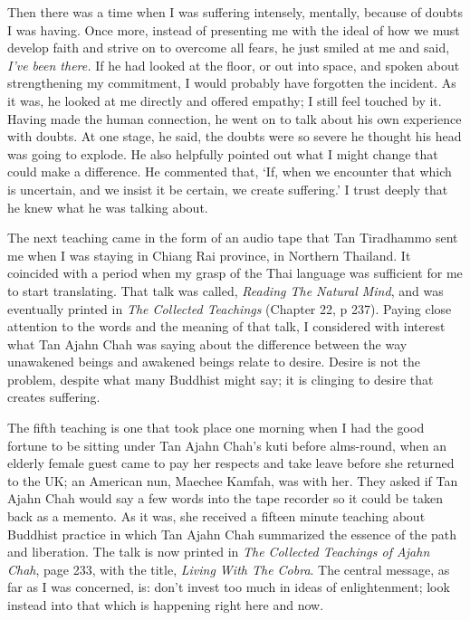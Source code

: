 Then there was a time when I was suffering intensely, mentally, because
of doubts I was having. Once more, instead of presenting me with the
ideal of how we must develop faith and strive on to overcome all fears,
he just smiled at me and said, \emph{I've been there.} If he had looked
at the floor, or out into space, and spoken about strengthening my
commitment, I would probably have forgotten the incident. As it was, he
looked at me directly and offered empathy; I still feel touched by it.
Having made the human connection, he went on to talk about his own
experience with doubts. At one stage, he said, the doubts were so severe
he thought his head was going to explode. He also helpfully pointed out
what I might change that could make a difference. He commented that,
`If, when we encounter that which is uncertain, and we insist it be
certain, we create suffering.' I trust deeply that he knew what he was
talking about.

The next teaching came in the form of an audio tape that Tan Tiradhammo
sent me when I was staying in Chiang Rai province, in Northern Thailand.
It coincided with a period when my grasp of the Thai language was
sufficient for me to start translating. That talk was called, \emph{Reading
The Natural Mind}, and was eventually printed in \emph{The Collected Teachings}\cite{collected}
(Chapter 22, p 237).
Paying close attention to the words and the meaning of that talk, I considered with
interest what Tan Ajahn Chah was saying about the difference between the
way unawakened beings and awakened beings relate to desire. Desire is
not the problem, despite what many Buddhist might say; it is clinging to
desire that creates suffering.

The fifth teaching is one that took place one morning when I had the
good fortune to be sitting under Tan Ajahn Chah's kuti before
alms-round, when an elderly female guest came to pay her respects and
take leave before she returned to the UK; an American nun, Maechee Kamfah,
was with her. They asked if Tan Ajahn Chah would say a few words into
the tape recorder so it could be taken back as a memento. As it was, she
received a fifteen minute teaching about Buddhist practice in which Tan
Ajahn Chah summarized the essence of the path and liberation. The talk
is now printed in \emph{The Collected Teachings of Ajahn Chah}\cite{collected},
page 233, with the title, \emph{Living With The Cobra}. The central message, as far as I
was concerned, is: don't invest too much in ideas of enlightenment; look
instead into that which is happening right here and now.

